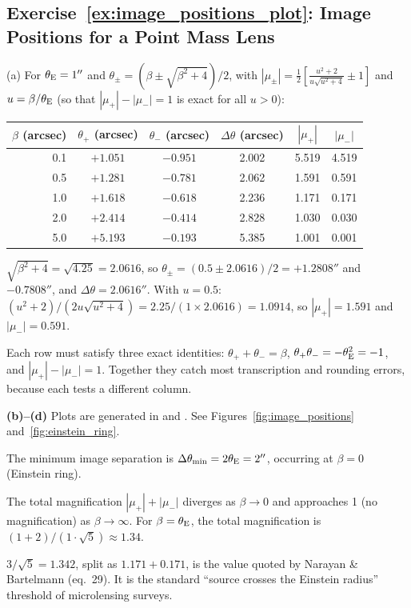 \subsection*{Exercise~\ref{ex:image_positions_plot}: Image Positions for a Point Mass Lens}

(a) For $\theta_{\mathrm{E}} = 1''$ and $\theta_\pm = (\beta \pm
\sqrt{\beta^2 + 4})/2$, with $|\mu_\pm| = \tfrac{1}{2}\!\left[\frac{u^2+2}{u\sqrt{u^2+4}}\pm 1\right]$
and $u = \beta/\theta_{\mathrm{E}}$ (so that $|\mu_+|-|\mu_-|=1$ is exact for all
$u>0$):

\begin{center}
\begin{tabular}{rccccc}
\toprule
$\beta$ (arcsec) & $\theta_+$ (arcsec) & $\theta_-$ (arcsec)
& $\Delta\theta$ (arcsec) & $|\mu_+|$ & $|\mu_-|$ \\
\midrule
0.1  & $+1.051$ & $-0.951$ & 2.002 & 5.519 & 4.519 \\
0.5  & $+1.281$ & $-0.781$ & 2.062 & 1.591 & 0.591 \\
1.0  & $+1.618$ & $-0.618$ & 2.236 & 1.171 & 0.171 \\
2.0  & $+2.414$ & $-0.414$ & 2.828 & 1.030 & 0.030 \\
5.0  & $+5.193$ & $-0.193$ & 5.385 & 1.001 & 0.001 \\
\bottomrule
\end{tabular}
\end{center}
\begin{derivation}[One row in full: $\beta = 0.5''$]
$\sqrt{\beta^2 + 4} = \sqrt{4.25} = 2.0616$, so
$\theta_\pm = (0.5 \pm 2.0616)/2 = +1.2808''$ and $-0.7808''$, and
$\Delta\theta = 2.0616''$. With $u = 0.5$:
$(u^2+2)/(2u\sqrt{u^2+4}) = 2.25/(1\times2.0616) = 1.0914$, so
$|\mu_+| = 1.591$ and $|\mu_-| = 0.591$.
\end{derivation}
\begin{annotation}
Each row must satisfy three exact identities: $\theta_+ + \theta_- = \beta$,
$\theta_+\theta_- = -\theta_{\mathrm{E}}^2 = -1$, and $|\mu_+| - |\mu_-| = 1$. Together they
catch most transcription and rounding errors, because each tests a different
column.
\end{annotation}

\textbf{(b)--(d)} Plots are generated in
and
.
See Figures~\ref{fig:image_positions} and~\ref{fig:einstein_ring}.

The minimum image separation is $\Delta\theta_{\mathrm{min}} = 2\theta_{\mathrm{E}} = 2''$,
occurring at $\beta = 0$ (Einstein ring).

The total magnification $|\mu_+| + |\mu_-|$ diverges as $\beta \to 0$
and approaches 1 (no magnification) as $\beta \to \infty$.  For
$\beta = \theta_{\mathrm{E}}$, the total magnification is
$(1 + 2)/(1 \cdot \sqrt{5}) \approx 1.34$.
\begin{annotation}
$3/\sqrt5 = 1.342$, split as $1.171 + 0.171$, is the value quoted by Narayan
\& Bartelmann (eq.~29). It is the standard ``source crosses the Einstein
radius'' threshold of microlensing surveys.
\end{annotation}
